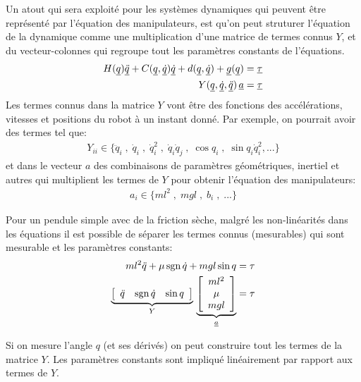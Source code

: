 Un atout qui sera exploité pour les systèmes dynamiques qui peuvent être représenté par l'équation des manipulateurs, est qu'on peut struturer l'équation de la dynamique comme une multiplication d'une matrice de termes connus $Y$, et du vecteur-colonnes qui regroupe tout les paramètres constants de l'équations.
\begin{align}
H(\underline{q}) \underline{\ddot{q}} + C(\underline{q},\underline{\dot{q}}) \underline{\dot{q}} + d(\underline{q}, \underline{\dot{q}}) + \underline{g}(\underline{q}) &= \underline{\tau} \\
Y(\underline{q},\underline{\dot{q}}, \underline{\ddot{q}} ) \,  \underline{a} &= \underline{\tau}
\end{align}
Les termes connus dans la matrice $Y$ vont être des fonctions des accélérations, vitesses et positions du robot à un instant donné. Par exemple, on pourrait avoir des termes tel que:
\begin{align}
Y_{ii} \in \{ \ddot{q}_i \; , \; \dot{q}_i \; , \; \dot{q}_i^2 \; , \; \dot{q}_i \dot{q}_j  \; , \; \cos q_i \; , \; \sin q_i \dot{q}_i^2 , ... \}
\end{align}
et dans le vecteur $a$ des combinaisons de paramètres géométriques, inertiel et autres qui multiplient les termes de $Y$ pour obtenir l'équation des manipulateurs:
\begin{align}
a_i \in \{ ml^2\; , \; mgl \; , \; b_i \; , \; ... \}
\end{align}


\newpage
\begin{example}

Pour un pendule simple avec de la friction sèche, malgré les non-linéarités dans les équations il est possible de séparer les termes connus (mesurables) qui sont mesurable et les paramètres constants:
\begin{align}
ml^2 \ddot{q} + \mu \operatorname{sgn}{\dot{q}} +  mgl \sin q &= \tau \\
\underbrace{
\left[
\begin{array}{ccc}
   \ddot{q}  &  \operatorname{sgn}{\dot{q}} & \sin q
\end{array} \right]
}_{Y}
\,
\underbrace{
\left[
\begin{array}{c}
 ml^2 \\ \mu \\ mgl
\end{array}\right]
}_{\underline{a}}
&= \tau
\end{align}

Si on mesure l'angle $q$ (et ses dérivés) on peut construire tout les termes de la matrice $Y$. Les paramètres constants sont impliqué linéairement par rapport aux termes de $Y$.
\end{example}


